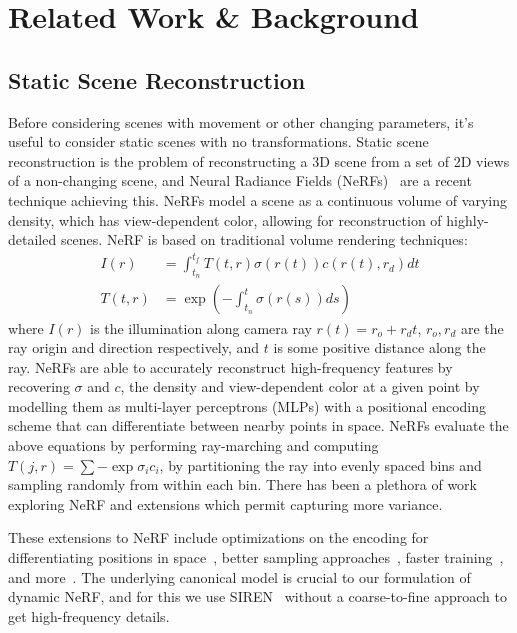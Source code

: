\section*{Related Work \& Background}

\subsection*{Static Scene Reconstruction}

Before considering scenes with movement or other changing parameters, it's useful to consider static scenes with no transformations.
Static scene reconstruction is the problem of reconstructing a 3D scene from a set of 2D views of a non-changing scene, and Neural Radiance Fields (NeRFs)~\cite{mildenhall2020nerf} are a recent technique achieving this. NeRFs model a scene as a continuous volume of varying density, which has view-dependent color, allowing for reconstruction of highly-detailed scenes. NeRF is based on traditional volume rendering techniques:
\begin{align}\label{eq:nerf}
I(r) &= \int_{t_n}^{t_f} T(t, r) \sigma(r(t)) c(r(t), r_d)dt \nonumber \\
T(t, r) &= \exp(-\int_{t_n}^{t} \sigma(r(s))ds)
\end{align}
\noindent
where $I(r)$ is the illumination along camera ray $r(t) = r_o + r_d t$, $r_o, r_d$ are the ray origin and direction respectively, and $t$ is some positive distance along the ray. NeRFs are able to accurately reconstruct high-frequency features by recovering $\sigma$ and $c$, the density and view-dependent color at a given point by modelling them as multi-layer perceptrons (MLPs) with a positional encoding scheme that can differentiate between nearby points in space. NeRFs evaluate the above equations by performing ray-marching and computing $T(j,r) = \sum -\exp\sigma_i c_i$, by partitioning the ray into evenly spaced bins and sampling randomly from within each bin. There has been a plethora of work exploring NeRF and extensions which permit capturing more variance.

These extensions to NeRF include optimizations on the encoding for differentiating positions in space~\cite{tancik2020fourfeat}, better sampling approaches~\cite{barron2021mipnerf}, faster training~\cite{yu2021plenoxels}, and more~\cite{sitzmann2019siren,bi2020neural,srinivasan2020nerv,boss2021nerd}. The underlying canonical model is crucial to our formulation of dynamic NeRF, and for this we use SIREN~\cite{sitzmann2019siren} without a coarse-to-fine approach to get high-frequency details.

